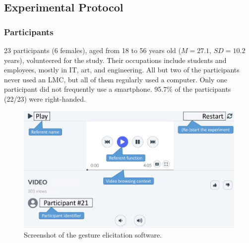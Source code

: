 \subsection{Experimental Protocol} \label{app:lui-ges:protocol}
\subsubsection{Participants} 
23 participants (6 females), aged from 18 to 56 years old ($M{=} 27.1$, $SD{=}10.2$ years), volunteered for the study. Their occupations include students and employees, mostly in IT, art, and engineering. All but two of the participants never used an LMC, but all of them regularly used a computer. Only one participant did not frequently use a smartphone. 95.7\% of the participants (22/23) were right-handed.


\begin{figure}[h!]
    \centering
    \includegraphics[width=\textwidth]{Figures/App-LUIGES/ges-ui.pdf}
    \caption{Screenshot of the gesture elicitation software.}
    \label{fig:lui-ges:real}
\end{figure}

